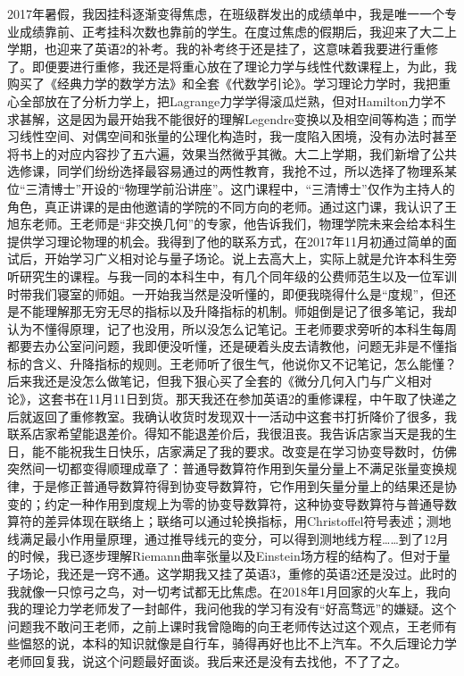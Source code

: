	    2017年暑假，我因挂科逐渐变得焦虑，在班级群发出的成绩单中，我是唯一一个专业成绩靠前、正考挂科次数也靠前的学生。在度过焦虑的假期后，我迎来了大二上学期，也迎来了英语2的补考。我的补考终于还是挂了，这意味着我要进行重修了。即便要进行重修，我还是将重心放在了理论力学与线性代数课程上，为此，我购买了《经典力学的数学方法》和全套《代数学引论》。学习理论力学时，我把重心全部放在了分析力学上，把Lagrange力学学得滚瓜烂熟，但对Hamilton力学不求甚解，这是因为最开始我不能很好的理解Legendre变换以及相空间等构造；而学习线性空间、对偶空间和张量的公理化构造时，我一度陷入困境，没有办法时甚至将书上的对应内容抄了五六遍，效果当然微乎其微。大二上学期，我们新增了公共选修课，同学们纷纷选择最容易通过的两性教育，我抢不过，所以选择了物理系某位“三清博士”开设的“物理学前沿讲座”。这门课程中，“三清博士”仅作为主持人的角色，真正讲课的是由他邀请的学院的不同方向的老师。通过这门课，我认识了王旭东老师。王老师是“非交换几何”的专家，他告诉我们，物理学院未来会给本科生提供学习理论物理的机会。我得到了他的联系方式，在2017年11月初通过简单的面试后，开始学习广义相对论与量子场论。说上去高大上，实际上就是允许本科生旁听研究生的课程。与我一同的本科生中，有几个同年级的公费师范生以及一位军训时带我们寝室的师姐。一开始我当然是没听懂的，即便我晓得什么是“度规”，但还是不能理解那无穷无尽的指标以及升降指标的机制。师姐倒是记了很多笔记，我却认为不懂得原理，记了也没用，所以没怎么记笔记。王老师要求旁听的本科生每周都要去办公室问问题，我即便没听懂，还是硬着头皮去请教他，问题无非是不懂指标的含义、升降指标的规则。王老师听了很生气，他说你又不记笔记，怎么能懂？后来我还是没怎么做笔记，但我下狠心买了全套的《微分几何入门与广义相对论》，这套书在11月11日到货。那天我还在参加英语2的重修课程，中午取了快递之后就返回了重修教室。我确认收货时发现双十一活动中这套书打折降价了很多，我联系店家希望能退差价。得知不能退差价后，我很沮丧。我告诉店家当天是我的生日，能不能祝我生日快乐，店家满足了我的要求。改变是在学习协变导数时，仿佛突然间一切都变得顺理成章了：普通导数算符作用到矢量分量上不满足张量变换规律，于是修正普通导数算符得到协变导数算符，它作用到矢量分量上的结果还是协变的；约定一种作用到度规上为零的协变导数算符，这种协变导数算符与普通导数算符的差异体现在联络上；联络可以通过轮换指标，用Christoffel符号表述；测地线满足最小作用量原理，通过推导线元的变分，可以得到测地线方程……到了12月的时候，我已逐步理解Riemann曲率张量以及Einstein场方程的结构了。但对于量子场论，我还是一窍不通。这学期我又挂了英语3，重修的英语2还是没过。此时的我就像一只惊弓之鸟，对一切考试都无比焦虑。在2018年1月回家的火车上，我向我的理论力学老师发了一封邮件，我问他我的学习有没有“好高骛远”的嫌疑。这个问题我不敢问王老师，之前上课时我曾隐晦的向王老师传达过这个观点，王老师有些愠怒的说，本科的知识就像是自行车，骑得再好也比不上汽车。不久后理论力学老师回复我，说这个问题最好面谈。我后来还是没有去找他，不了了之。


